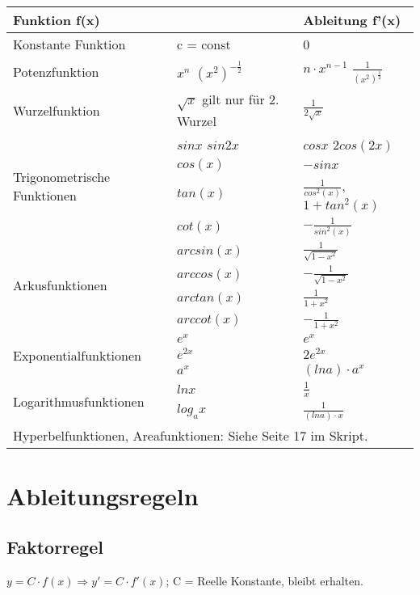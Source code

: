 \documentclass[a4paper,DIV10,12pt,headsepline,smallheadings,halfparskip-]{scrreprt}
\begin{document}
	\begin{longtable}{|l|l|l|}
		\hline
		\multicolumn{2}{|l|}{Funktion f(x)}  & Ableitung f'(x) \\
		\hline
		Konstante Funktion & c = const & 0 \\
		\hline
		Potenzfunktion & \(x^n\) \newline \((x^2)^{-\frac{1}{2}} \) & \(n \cdot x^{n-1}\) \newline \(\frac{1}{(x^{2})^{\frac{1}{2}}}\) \\
		\hline
		Wurzelfunktion & \(\sqrt{x}\) gilt nur für 2. Wurzel & \(\frac{1}{2 \sqrt{x}}\) \\
		\hline
		\multirow{4}{*}{Trigonometrische Funktionen} & \(sin x\) \newline \(sin 2x\) & \(cos x\) \newline \(2 cos (2x)\) \\ \cline{2-3}
		& \(cos(x)\)  & \(-sin x\) \\ \cline{2-3}
		& \(tan(x)\) & \(\frac{1}{cos^2(x)}\), \( 1 + tan^2(x) \) \\ \cline{2-3}
		& \(cot(x)\) & \(-\frac{1}{sin^2(x)}\) \\
		\hline
		\multirow{4}{*}{Arkusfunktionen} & \(arcsin(x)\) & \(\frac{1}{\sqrt{1 - x^2}} \) \\ \cline{2-3}
		& \(arccos(x)\) & \(-\frac{1}{\sqrt{1-x^2}}\) \\ \cline{2-3}
		& \(arctan(x)\) & \(\frac{1}{1+x^2}\) \\ \cline{2-3}
		& \(arccot(x)\) & \(-\frac{1}{1+x^2}\) \\
		\hline
		\multirow{3}{*}{Exponentialfunktionen} & \(e^x\) & \( e^x \) \\ \cline{2-3}
		& \(e^{2x}\) & \( 2e^{2x} \) \\ \cline{2-3}
		& \(a^x\) & \((ln a) \cdot a^x \) \\ \hline
		\multirow{2}{*}{Logarithmusfunktionen} & \(ln x\) & \( \frac{1}{x} \) \\ \cline{2-3}
		& \(log_a x\) & \( \frac{1}{(ln a) \cdot x } \) \\ \hline
		\multicolumn{3}{|l|}{Hyperbelfunktionen, Areafunktionen: Siehe Seite 17 im Skript.} \\ \hline
	\end{longtable}

	\section{Ableitungsregeln}
	\subsection{Faktorregel}
	\(y = C \cdot f(x) \Rightarrow y' = C \cdot f'(x)\); C = Reelle Konstante, bleibt erhalten.
\end{document}
